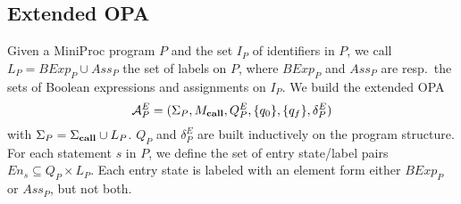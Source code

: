 \documentclass[9pt,a4paper]{article}
\begin{document}
\subsection{Extended OPA}
Given a MiniProc program $P$ and the set $I_P$ of identifiers in $P$,
we call $L_P = \mathit{BExp}_P \cup \mathit{Ass}_P$ the set of labels on $P$,
where $\mathit{BExp}_P$ and $\mathit{Ass}_P$ are resp.\ the sets of Boolean expressions and assignments on $I_P$.
We build the extended OPA
\[\mathcal{A}^E_P = (\Sigma_P, \allowbreak M_{\mathbf{call}}, \allowbreak Q^E_P, \allowbreak \{q_0\}, \allowbreak \{q_f\}, \allowbreak \delta^E_P)\]
with $\Sigma_P = \Sigma_{\mathbf{call}} \cup L_P$.
$Q_P$ and $\delta^E_P$ are built inductively on the program structure.
For each statement $s$ in $P$, we define the set of entry state/label pairs $\mathit{En}_s \subseteq Q_P \times L_P$.
Each entry state is labeled with an element form either $\mathit{BExp}_P$ or $\mathit{Ass}_P$, but not both.
\end{document}
